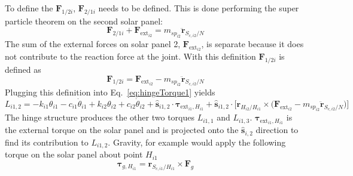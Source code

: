 \documentclass[paper]{aiaaNew}
\begin{document}
	To define the $\bm F_{1/2i}$, $\bm F_{2/1i}$ needs to be defined. This is done performing the super particle theorem on the second solar panel:
	\begin{equation}
	\bm F_{2/1i} + \bm F_{\text{ext}_{i2}} = m_{sp_{i2}} \ddot{\bm{r}}_{S_{c,i2}/N}
	\end{equation}
	The sum of the external forces on solar panel 2, $\bm F_{\text{ext}_{i2}}$, is separate because it does not contribute to the reaction force at the joint. With this definition $\bm F_{1/2i}$ is defined as
	\begin{equation}
	\bm F_{1/2i} = \bm F_{\text{ext}_{i2}}  - m_{sp_{i2}} \ddot{\bm{r}}_{S_{c,i2}/N} 
	\end{equation}
	Plugging this definition into Eq.~\eqref{eq:hingeTorque1} yields
	\begin{equation}
	L_{i1,2} = - k_{i1} \theta_{i1} - c_{i1}\dot{\theta}_{i1} +  k_{i2} \theta_{i2} + c_{i2} \dot\theta_{i2} + \hat{\bm s}_{i1,2} \cdot \bm \tau_{\text{ext}_{i1},H_{i1}} + \hat{\bm s}_{i1,2} \cdot \Big[\bm{r}_{H_{i2}/H_{i1}} \times \big(\bm F_{\text{ext}_{i2}}  - m_{sp_{i2}} \ddot{\bm{r}}_{S_{c,i2}/N}\big)\Big]
	\label{eq:hingeTorque2}
	\end{equation}
	The hinge structure produces the other two torques $L_{i1,1}$ and $L_{i1,3}$. $\bm \tau_{\text{ext}_{i1},H_{i1}}$ is the external torque on the solar panel and is projected onto the $\hat{\bm s}_{i,2}$ direction to find its contribution to $L_{i1,2}$. Gravity, for example would apply the following torque on the solar panel about point $H_{i1}$
	\begin{equation}
	\bm \tau_{g,H_{i1}} = \bm r_{S_{c,i1}/H_{i1}} \times \bm F_g
	\end{equation}
	
\end{document}

